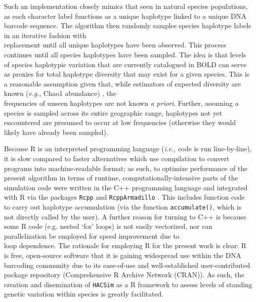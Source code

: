 \noindent Such an implementation closely mimics that seen in natural species populations, as each character label functions as a unique haplotype linked to a unique DNA barcode sequence. The algorithm then randomly samples species haplotype labels in an iterative fashion with \\ replacement until all unique haplotypes have been observed. This process continues until all species haplotypes have been sampled. The idea is that levels of species haplotypic variation that are currently catalogued in BOLD can serve as proxies for total haplotype diversity that may exist for a given species. This is a reasonable assumption given that, while estimators of expected diversity are known (\textit{e.g.}, Chao1 abundance) \cite{chao1984nonparametric}, the \\ frequencies of unseen haplotypes are not known \textit{a priori}. Further, assuming a species is sampled across its entire geographic range, haplotypes not yet encountered are presumed to occur at low frequencies (otherwise they would likely have already been sampled). 

Because R is an interpreted programming language (\textit{i.e.}, code is run line-by-line), it is slow compared to faster alternatives which use compilation to convert programs into machine-readable format; as such, to optimize performance of the present algorithm in terms of runtime, computationally-intensive parts of the simulation code were written in the C++ programming language and integrated with R via the packages {\tt Rcpp} \cite{eddelbuettel2011} and {\tt RcppArmadillo} \cite{eddelbuettel2014}. This includes function code to carry out haplotype accumulation (via the function {\tt accumulate()}, which is not directly called by the user). A further reason for turning to C++ is because some R code (e.g. nested `for' loops) is not easily vectorized, nor can parallelization be employed for speed improvement due to \\ loop dependence. The rationale for employing R for the present work is clear: R is free, open-source software that it is gaining widespread use within the DNA barcoding community due to its ease-of-use and well-established user-contributed package repository (Comprehensive R Archive Network (CRAN)). As such, the creation and disemination of {\tt HACSim} as a R framework to assess levels of standing genetic variation within species is greatly facilitated.


